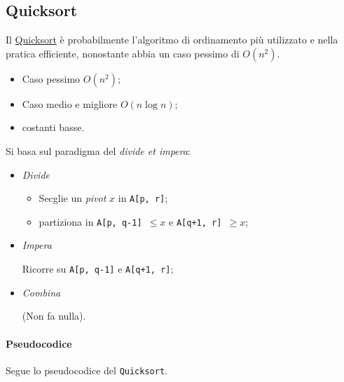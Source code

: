 \subsection{Quicksort}
Il \href{https://en.wikipedia.org/wiki/Quicksort}{Quicksort} è probabilmente l'algoritmo di ordinamento
più utilizzato e nella pratica efficiente, nonostante abbia un caso pessimo di $O(n^2)$.
\begin{itemize}
	\item Caso pessimo $O(n^2)$;
	\item Caso medio e migliore $O(n \log n)$;
	\item costanti basse.
\end{itemize}
Si basa sul paradigma del \textit{divide et impera}:
\begin{itemize}
	\item \textit{Divide}
	\begin{itemize}[label=$\rightarrow$]
		\item Secglie un \textit{pivot} $x$ in \texttt{A[p, r]};
		\item partiziona in \texttt{A[p, q-1] $\leq x$} e \texttt{A[q+1, r] $\geq x$};
	\end{itemize}
	\item \textit{Impera} \par
	Ricorre su \texttt{A[p, q-1]} e \texttt{A[q+1, r]};
	\item \textit{Combina}\par
	(Non fa nulla).
\end{itemize}

\paragraph{Pseudocodice} Segue lo pseudocodice del \texttt{Quicksort}.



